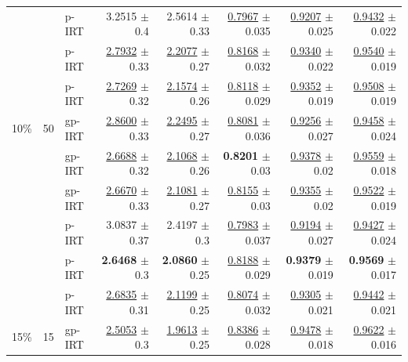 \begin{longtable}{llp{}rrrrr}
 &  & p-IRT & 3.2515 {\scriptsize $\pm$ 0.4} & 2.5614 {\scriptsize $\pm$ 0.33} & \underline{0.7967} {\scriptsize $\pm$ 0.035} & \underline{0.9207} {\scriptsize $\pm$ 0.025} & \underline{0.9432} {\scriptsize $\pm$ 0.022} \\
 &  & p-IRT & \underline{2.7932} {\scriptsize $\pm$ 0.33} & \underline{2.2077} {\scriptsize $\pm$ 0.27} & \underline{0.8168} {\scriptsize $\pm$ 0.032} & \underline{0.9340} {\scriptsize $\pm$ 0.022} & \underline{0.9540} {\scriptsize $\pm$ 0.019} \\
 &  & p-IRT & \underline{2.7269} {\scriptsize $\pm$ 0.32} & \underline{2.1574} {\scriptsize $\pm$ 0.26} & \underline{0.8118} {\scriptsize $\pm$ 0.029} & \underline{0.9352} {\scriptsize $\pm$ 0.019} & \underline{0.9508} {\scriptsize $\pm$ 0.019} \\
\midrule
10\% & 50 & gp-IRT & \underline{2.8600} {\scriptsize $\pm$ 0.33} & \underline{2.2495} {\scriptsize $\pm$ 0.27} & \underline{0.8081} {\scriptsize $\pm$ 0.036} & \underline{0.9256} {\scriptsize $\pm$ 0.027} & \underline{0.9458} {\scriptsize $\pm$ 0.024} \\
 &  & gp-IRT & \underline{2.6688} {\scriptsize $\pm$ 0.32} & \underline{2.1068} {\scriptsize $\pm$ 0.26} & \textbf{0.8201} {\scriptsize $\pm$ 0.03} & \underline{0.9378} {\scriptsize $\pm$ 0.02} & \underline{0.9559} {\scriptsize $\pm$ 0.018} \\
 &  & gp-IRT & \underline{2.6670} {\scriptsize $\pm$ 0.33} & \underline{2.1081} {\scriptsize $\pm$ 0.27} & \underline{0.8155} {\scriptsize $\pm$ 0.03} & \underline{0.9355} {\scriptsize $\pm$ 0.02} & \underline{0.9522} {\scriptsize $\pm$ 0.019} \\
 &  & p-IRT & 3.0837 {\scriptsize $\pm$ 0.37} & 2.4197 {\scriptsize $\pm$ 0.3} & \underline{0.7983} {\scriptsize $\pm$ 0.037} & \underline{0.9194} {\scriptsize $\pm$ 0.027} & \underline{0.9427} {\scriptsize $\pm$ 0.024} \\
 &  & p-IRT & \textbf{2.6468} {\scriptsize $\pm$ 0.3} & \textbf{2.0860} {\scriptsize $\pm$ 0.25} & \underline{0.8188} {\scriptsize $\pm$ 0.029} & \textbf{0.9379} {\scriptsize $\pm$ 0.019} & \textbf{0.9569} {\scriptsize $\pm$ 0.017} \\
 &  & p-IRT & \underline{2.6835} {\scriptsize $\pm$ 0.31} & \underline{2.1199} {\scriptsize $\pm$ 0.25} & \underline{0.8074} {\scriptsize $\pm$ 0.032} & \underline{0.9305} {\scriptsize $\pm$ 0.021} & \underline{0.9442} {\scriptsize $\pm$ 0.021} \\
\midrule
15\% & 15 & gp-IRT & \underline{2.5053} {\scriptsize $\pm$ 0.3} & \underline{1.9613} {\scriptsize $\pm$ 0.25} & \underline{0.8386} {\scriptsize $\pm$ 0.028} & \underline{0.9478} {\scriptsize $\pm$ 0.018} & \underline{0.9622} {\scriptsize $\pm$ 0.016} \\

\end{longtable}
